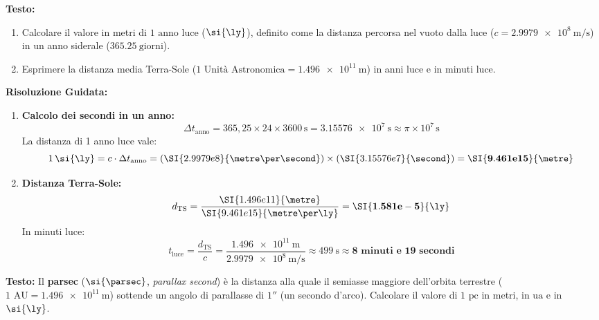 \begin{esercizio}
\textbf{Testo:}
\begin{enumerate}
    \item Calcolare il valore in metri di $1\text{ anno luce}$ ($\si{\ly}$), definito come la distanza percorsa nel vuoto dalla luce ($c = \SI{2.9979e8}{\metre\per\second}$) in un anno siderale ($\SI{365.25}{\text{giorni}}$).
    \item Esprimere la distanza media Terra-Sole ($1\text{ Unità Astronomica} = \SI{1.496e11}{\metre}$) in anni luce e in minuti luce.
\end{enumerate}

\textbf{Risoluzione Guidata:}
\begin{enumerate}
    \item \textbf{Calcolo dei secondi in un anno:}
    \begin{equation}
        \Delta t_{\text{anno}} = 365{,}25 \times 24 \times 3600\,\si{\second} = \SI{3.15576e7}{\second} \approx \pi \times 10^7\,\si{\second}
    \end{equation}
    La distanza di 1 anno luce vale:
    \begin{equation}
        1\,\si{\ly} = c \cdot \Delta t_{\text{anno}} = (\SI{2.9979e8}{\metre\per\second}) \times (\SI{3.15576e7}{\second}) = \mathbf{\SI{9.461e15}{\metre}}
    \end{equation}
    
    \item \textbf{Distanza Terra-Sole:}
    \begin{equation}
        d_{\text{TS}} = \frac{\SI{1.496e11}{\metre}}{\SI{9.461e15}{\metre\per\ly}} = \mathbf{\SI{1.581e-5}{\ly}}
    \end{equation}
    In minuti luce:
    \begin{equation}
        t_{\text{luce}} = \frac{d_{\text{TS}}}{c} = \frac{\SI{1.496e11}{\metre}}{\SI{2.9979e8}{\metre\per\second}} \approx \SI{499}{\second} \approx \mathbf{8\text{ minuti e } 19\text{ secondi}}
    \end{equation}
\end{enumerate}
\end{esercizio}

\begin{esercizio}
\textbf{Testo:}
Il \textbf{parsec} ($\si{\parsec}$, \emph{parallax second}) è la distanza alla quale il semiasse maggiore dell'orbita terrestre ($1\text{ AU} = \SI{1.496e11}{\metre}$) sottende un angolo di parallasse di $1''$ (un secondo d'arco). Calcolare il valore di $1\text{ pc}$ in metri, in $\si{\astronomicalunit}$ e in $\si{\ly}$.
\end{esercizio}

